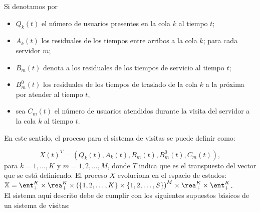 Si denotamos por
\begin{itemize}
\item $Q_{k}\left(t\right)$ el n\'umero de usuarios presentes en
la cola $k$ al tiempo $t$; \item $A_{k}\left(t\right)$ los
residuales de los tiempos entre arribos a la cola $k$; para cada
servidor $m$; \item $B_{m}\left(t\right)$ denota a los residuales
de los tiempos de servicio al tiempo $t$; \item
$B_{m}^{0}\left(t\right)$ los residuales de los tiempos de
traslado de la cola $k$ a la pr\'oxima por atender al tiempo $t$,

\item sea
$C_{m}\left(t\right)$ el n\'umero de usuarios atendidos durante la
visita del servidor a la cola $k$ al tiempo $t$.
\end{itemize}


En este sentido, el proceso para el sistema de visitas se puede
definir como:

\begin{equation}\label{Esp.Edos.Down}
X\left(t\right)^{T}=\left(Q_{k}\left(t\right),A_{k}\left(t\right),B_{m}\left(t\right),B_{m}^{0}\left(t\right),C_{m}\left(t\right)\right),
\end{equation}
para $k=1,\ldots,K$ y $m=1,2,\ldots,M$, donde $T$ indica que es el
transpuesto del vector que se est\'a definiendo. El proceso $X$
evoluciona en el espacio de estados:
$\mathbb{X}=\ent_{+}^{K}\times\rea_{+}^{K}\times\left(\left\{1,2,\ldots,K\right\}\times\left\{1,2,\ldots,S\right\}\right)^{M}\times\rea_{+}^{K}\times\ent_{+}^{K}$.\\

El sistema aqu\'i descrito debe de cumplir con los siguientes supuestos b\'asicos de un sistema de visitas:
